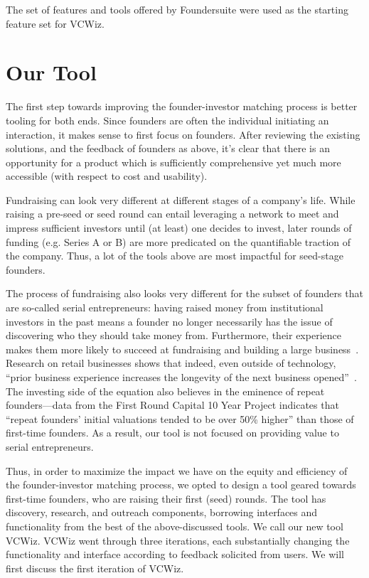 The set of features and tools offered by Foundersuite were used as the starting feature set for VCWiz.

\section{Our Tool}
\label{chap3:tool}

The first step towards improving the founder-investor matching process is better tooling for both ends. Since founders are often the individual initiating an interaction, it makes sense to first focus on founders. After reviewing the existing solutions, and the feedback of founders as above, it's clear that there is an opportunity for a product which is sufficiently comprehensive yet much more accessible (with respect to cost and usability).

Fundraising can look very different at different stages of a company's life. While raising a pre-seed or seed round can entail leveraging a network to meet and impress sufficient investors until (at least) one decides to invest, later rounds of funding (e.g. Series A or B) are more predicated on the quantifiable traction of the company. Thus, a lot of the tools above are most impactful for seed-stage founders.

The process of fundraising also looks very different for the subset of founders that are so-called serial entrepreneurs: having raised money from institutional investors in the past means a founder no longer necessarily has the issue of discovering who they should take money from. Furthermore, their experience makes them more likely to succeed at fundraising and building a large business~\cite{gompers2010performance}. Research on retail businesses shows that indeed, even outside of technology, ``prior business experience increases the longevity of the next business opened''~\cite{doi:10.1086/683820}. The investing side of the equation also believes in the eminence of repeat founders---data from the First Round Capital 10 Year Project \cite{first-round-10-years} indicates that ``repeat founders' initial valuations tended to be over 50\% higher'' than those of first-time founders. As a result, our tool is not focused on providing value to serial entrepreneurs.

Thus, in order to maximize the impact we have on the equity and efficiency of the founder-investor matching process, we opted to design a tool geared towards first-time founders, who are raising their first (seed) rounds. The tool has discovery, research, and outreach components, borrowing interfaces and functionality from the best of the above-discussed tools. We call our new tool VCWiz. VCWiz went through three iterations, each substantially changing the functionality and interface according to feedback solicited from users. We will first discuss the first iteration of VCWiz.

